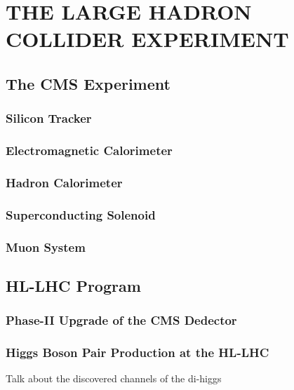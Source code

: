 \chapter{THE LARGE HADRON COLLIDER EXPERIMENT}\label{Ch2}
\vspace*{-12pt} %

\section{The CMS Experiment}

\subsection{Silicon Tracker}

\subsection{Electromagnetic Calorimeter}

\subsection{Hadron Calorimeter}

\subsection{Superconducting Solenoid}

\subsection{Muon System}

\section{HL-LHC Program}

\subsection{Phase-II Upgrade of the CMS Dedector}

\subsection{Higgs Boson Pair Production at the HL-LHC}

Talk about the discovered channels of the di-higgs